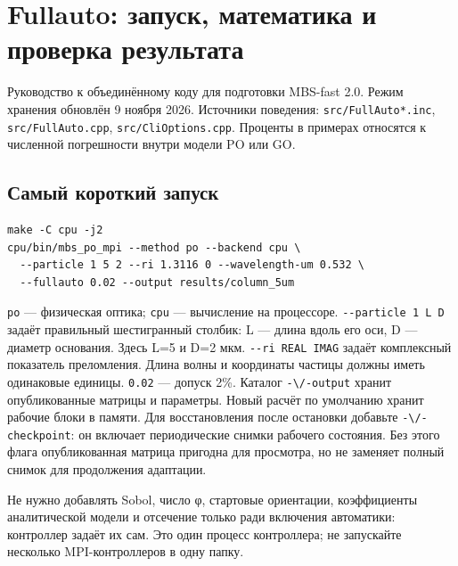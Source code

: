 \section{Fullauto: запуск, математика и проверка
результата}\label{fullauto-ux437ux430ux43fux443ux441ux43a-ux43cux430ux442ux435ux43cux430ux442ux438ux43aux430-ux438-ux43fux440ux43eux432ux435ux440ux43aux430-ux440ux435ux437ux443ux43bux44cux442ux430ux442ux430}

Руководство к объединённому коду для подготовки MBS-fast 2.0. Режим
хранения обновлён 9 ноября 2026. Источники поведения:
\nolinkurl{src/FullAuto*.inc}, \nolinkurl{src/FullAuto.cpp},
\nolinkurl{src/CliOptions.cpp}. Проценты в примерах относятся к численной
погрешности внутри модели PO или GO.

\subsection{Самый короткий
запуск}\label{ux441ux430ux43cux44bux439-ux43aux43eux440ux43eux442ux43aux438ux439-ux437ux430ux43fux443ux441ux43a}

\noindent\begin{minipage}{\linewidth}
\begin{verbatim}
make -C cpu -j2
cpu/bin/mbs_po_mpi --method po --backend cpu \
  --particle 1 5 2 --ri 1.3116 0 --wavelength-um 0.532 \
  --fullauto 0.02 --output results/column_5um
\end{verbatim}
\end{minipage}

\texttt{po} --- физическая оптика; \texttt{cpu} --- вычисление на
процессоре. \texttt{-\/-particle\ 1\ L\ D} задаёт правильный
шестигранный столбик: L --- длина вдоль его оси, D --- диаметр
основания. Здесь L=5 и D=2 мкм. \texttt{-\/-ri\ REAL\ IMAG} задаёт
комплексный показатель преломления. Длина волны и координаты частицы
должны иметь одинаковые единицы. \texttt{0.02} --- допуск 2\%. Каталог
\nolinkurl{-\/-output} хранит опубликованные матрицы и параметры. Новый
расчёт по умолчанию хранит рабочие блоки в памяти. Для восстановления
после остановки добавьте \nolinkurl{-\/-checkpoint}: он включает
периодические снимки рабочего состояния. Без этого флага опубликованная
матрица пригодна для просмотра, но не заменяет полный снимок для
продолжения адаптации.

Не нужно добавлять Sobol, число φ, стартовые ориентации, коэффициенты
аналитической модели и отсечение только ради включения автоматики:
контроллер задаёт их сам. Это один процесс контроллера; не запускайте
несколько MPI-контроллеров в одну папку.

